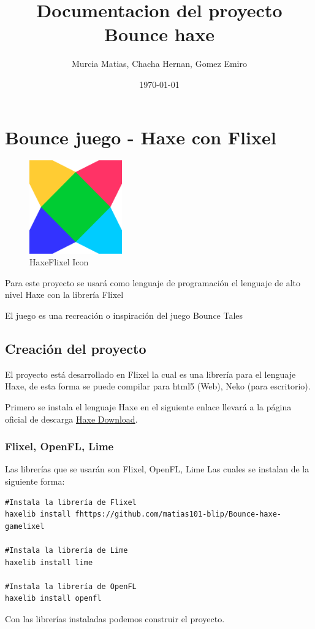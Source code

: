 \documentclass[11pt]{article}
\author{Murcia Matias, Chacha Hernan, Gomez Emiro}
\date{\today}
\title{Documentacion del proyecto Bounce haxe}
\begin{document}
\maketitle
\tableofcontents

\section{Bounce juego - Haxe con Flixel}
\label{sec:orgcfd5092}

\begin{figure}[htbp]
\centering
\includegraphics[width=4cm]{./img/haxeflixel.png}
\caption{\label{fig:HaxeFlixel}HaxeFlixel Icon}
\end{figure}

Para este proyecto se usará como lenguaje de programación
el lenguaje de alto nivel \guillemotleft{}Haxe\guillemotright{} con la librería \guillemotleft{}Flixel\guillemotright{}

El juego es una recreación o inspiración del juego \guillemotleft{}Bounce Tales\guillemotright{}

\subsection{Creación del proyecto}
\label{sec:org4b04bba}
El proyecto está desarrollado en \guillemotleft{}Flixel\guillemotright{} la cual es una librería para
el lenguaje \guillemotleft{}Haxe\guillemotright{}, de esta forma se puede compilar para html5 (Web), Neko (para escritorio).

Primero se instala el lenguaje \guillemotleft{}Haxe\guillemotright{} en el siguiente enlace llevará a la página oficial
de descarga \href{https://haxe.org/download/}{Haxe Download}.

\subsubsection{Flixel, OpenFL, Lime}
\label{sec:org1c868bc}
Las librerías que se usarán son Flixel, OpenFL, Lime
Las cuales se instalan de la siguiente forma:
\begin{verbatim}
#Instala la librería de Flixel
haxelib install fhttps://github.com/matias101-blip/Bounce-haxe-gamelixel

#Instala la librería de Lime
haxelib install lime

#Instala la librería de OpenFL
haxelib install openfl
\end{verbatim}
Con las librerías instaladas podemos construir el proyecto.
\end{document}
